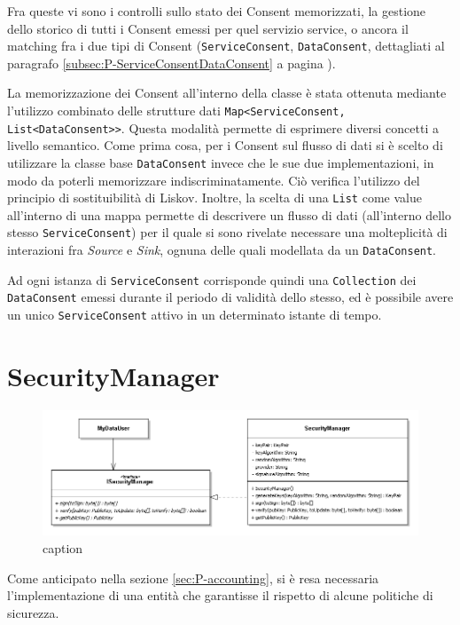 Fra queste vi sono i controlli sullo stato dei Consent memorizzati, la gestione dello storico di tutti i Consent emessi per quel servizio service, o ancora il matching fra i due tipi di Consent (\texttt{ServiceConsent}, \texttt{DataConsent}, dettagliati al paragrafo \ref{subsec:P-ServiceConsentDataConsent} a pagina \pageref{subsec:P-ServiceConsentDataConsent}).

La memorizzazione dei Consent all’interno della classe \`e stata ottenuta mediante l’utilizzo combinato delle strutture dati \texttt{Map<ServiceConsent, \-List\-<Data\-Consent>>}. Questa modalit\`a permette di esprimere diversi concetti a livello semantico. Come prima cosa, per i Consent sul flusso di dati si \`e scelto di utilizzare la classe base \texttt{DataConsent} invece che le sue due implementazioni, in modo da poterli memorizzare indiscriminatamente. Ci\`o verifica l’utilizzo del principio di sostituibilit\`a di Liskov. Inoltre, la scelta di una \texttt{List} come value all’interno di una mappa permette di descrivere un flusso di dati (all’interno dello stesso \texttt{ServiceConsent}) per il quale si sono rivelate necessare una molteplicit\`a di interazioni fra \textit{Source} e \textit{Sink}, ognuna delle quali modellata da un \texttt{DataConsent}.

Ad ogni istanza di \texttt{ServiceConsent} corrisponde quindi una \texttt{Collection} dei \texttt{DataConsent} emessi durante il periodo di validit\`a dello stesso, ed \`e possibile avere un unico \texttt{ServiceConsent} attivo in un determinato istante di tempo.

\section{SecurityManager}
\begin{figure} [h]
	\includegraphics[width=\linewidth]{pictures/Accounting-SecurityManager.png}
	\caption{caption}
	\label{fig:Accounting-SecurityManager}
\end{figure}
Come anticipato nella sezione \ref{sec:P-accounting}, si \`e resa necessaria l'implementazione di una entit\`a che garantisse il rispetto di alcune politiche di sicurezza.

